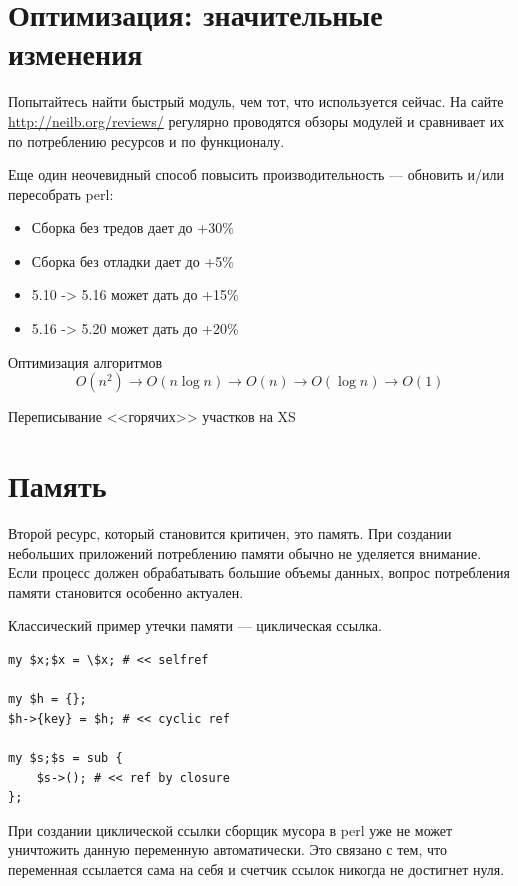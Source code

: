 \section{Оптимизация: значительные изменения}
Попытайтесь найти быстрый модуль, чем тот, что используется сейчас. На сайте \url{http://neilb.org/reviews/} регулярно проводятся обзоры модулей и сравнивает их по потреблению ресурсов и по функционалу.

Еще один неочевидный способ повысить производительность --- обновить и/или пересобрать perl:
\begin{itemize}[nosep]
	\item Сборка без тредов дает до +30\%
	\item Сборка без отладки дает до +5\%
	\item 5.10 -> 5.16 может дать до +15\%
	\item 5.16 -> 5.20 может дать до +20\%
\end{itemize}


Оптимизация алгоритмов
\[    O(n^2) \to O(n \log n) \to O(n) \to O(\log n) \to O(1) \]

Переписывание <<горячих>> участков на XS

\section{Память}
Второй ресурс, который становится критичен, это память. При создании небольших приложений потреблению памяти обычно не уделяется внимание. Если процесс должен обрабатывать большие объемы данных, вопрос потребления памяти становится особенно актуален.

Классический пример утечки памяти --- циклическая ссылка.
\begin{verbatim}
my $x;$x = \$x; # << selfref

my $h = {};
$h->{key} = $h; # << cyclic ref

my $s;$s = sub {
    $s->(); # << ref by closure
};
\end{verbatim}
При создании циклической ссылки сборщик мусора в perl уже не может уничтожить данную переменную автоматически. Это связано с тем, что переменная ссылается сама на себя и счетчик ссылок никогда не достигнет нуля.

